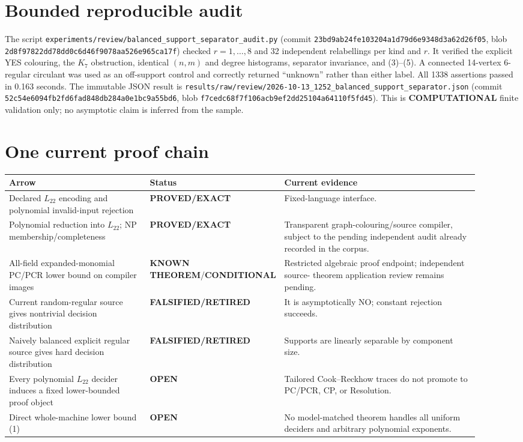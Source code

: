 \documentclass[11pt]{article}
\newcommand{\Ltwo}{L_{22}}
\newcommand{\EXACT}{\textbf{PROVED/EXACT}}
\newcommand{\KNOWN}{\textbf{KNOWN THEOREM}}
\newcommand{\COMP}{\textbf{COMPUTATIONAL}}
\newcommand{\COND}{\textbf{CONDITIONAL}}
\newcommand{\OPEN}{\textbf{OPEN}}
\newcommand{\RET}{\textbf{FALSIFIED/RETIRED}}
\begin{document}
\section{Bounded reproducible audit}
The script
\texttt{experiments/review/balanced\_support\_separator\_audit.py}
(commit \texttt{23bd9ab24fe103204a1d79d6e9348d3a62d26f05}, blob
\texttt{2d8f97822dd78dd0c6d46f9078aa526e965ca17f}) checked $r=1,\ldots,8$
and 32 independent relabellings per kind and $r$.  It verified the explicit
YES colouring, the $K_7$ obstruction, identical $(n,m)$ and degree
histograms, separator invariance, and (3)--(5).  A connected 14-vertex
6-regular circulant was used as an off-support control and correctly
returned ``unknown'' rather than either label.  All 1338 assertions passed
in 0.163 seconds.  The immutable JSON result is
\texttt{results/raw/review/2026-10-13\_1252\_balanced\_support\_separator.json}
(commit \texttt{52c54e6094fb2fd6fad848db284a0e1bc9a55bd6}, blob
\texttt{f7cedc68f7f106acb9ef2dd25104a64110f5fd45}).
This is \COMP{} finite validation only; no asymptotic claim is inferred from
the sample.

\section{One current proof chain}
\begin{center}
\begin{tabular}{p{0.31\linewidth}p{0.15\linewidth}p{0.45\linewidth}}
\toprule
Arrow & Status & Current evidence\\
\midrule
Declared $\Ltwo$ encoding and polynomial invalid-input rejection &
\EXACT & Fixed-language interface.\\
Polynomial reduction into $\Ltwo$; NP membership/completeness &
\EXACT & Transparent graph-colouring/source compiler, subject to the pending
independent audit already recorded in the corpus.\\
All-field expanded-monomial PC/PCR lower bound on compiler images &
\KNOWN/\COND & Restricted algebraic proof endpoint; independent source-
theorem application review remains pending.\\
Current random-regular source gives nontrivial decision distribution &
\RET & It is asymptotically NO; constant rejection succeeds.\\
Naively balanced explicit regular source gives hard decision distribution &
\RET & Supports are linearly separable by component size.\\
Every polynomial $\Ltwo$ decider induces a fixed lower-bounded proof object &
\OPEN & Tailored Cook--Reckhow traces do not promote to PC/PCR, CP, or
Resolution.\\
Direct whole-machine lower bound (1) & \OPEN & No model-matched theorem
handles all uniform deciders and arbitrary polynomial exponents.\\
\bottomrule
\end{tabular}
\end{center}
\end{document}
